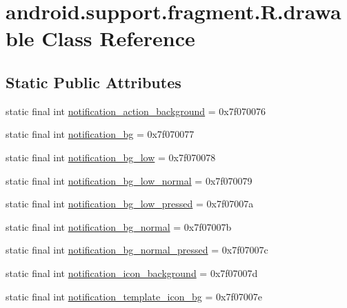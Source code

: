 \hypertarget{classandroid_1_1support_1_1fragment_1_1_r_1_1drawable}{}\section{android.\+support.\+fragment.\+R.\+drawable Class Reference}
\label{classandroid_1_1support_1_1fragment_1_1_r_1_1drawable}
\subsection*{Static Public Attributes}
\begin{DoxyCompactItemize}
\item 
static final int \mbox{\hyperlink{classandroid_1_1support_1_1fragment_1_1_r_1_1drawable_a086af7e7931dbe4e82c720a77fe3d3ae}{notification\+\_\+action\+\_\+background}} = 0x7f070076
\item 
static final int \mbox{\hyperlink{classandroid_1_1support_1_1fragment_1_1_r_1_1drawable_a6f047fed5aab004876674c2a21947011}{notification\+\_\+bg}} = 0x7f070077
\item 
static final int \mbox{\hyperlink{classandroid_1_1support_1_1fragment_1_1_r_1_1drawable_ae752bec4177894876af7fe198eef3a93}{notification\+\_\+bg\+\_\+low}} = 0x7f070078
\item 
static final int \mbox{\hyperlink{classandroid_1_1support_1_1fragment_1_1_r_1_1drawable_affebf5f3af26bcc00661a293dc1aab89}{notification\+\_\+bg\+\_\+low\+\_\+normal}} = 0x7f070079
\item 
static final int \mbox{\hyperlink{classandroid_1_1support_1_1fragment_1_1_r_1_1drawable_ae105cc655521bfd8d0a45fc06338ed5d}{notification\+\_\+bg\+\_\+low\+\_\+pressed}} = 0x7f07007a
\item 
static final int \mbox{\hyperlink{classandroid_1_1support_1_1fragment_1_1_r_1_1drawable_a58ea29ffeb1ee70047e694a612e479d0}{notification\+\_\+bg\+\_\+normal}} = 0x7f07007b
\item 
static final int \mbox{\hyperlink{classandroid_1_1support_1_1fragment_1_1_r_1_1drawable_a68c5f11206805023128791be315ec21e}{notification\+\_\+bg\+\_\+normal\+\_\+pressed}} = 0x7f07007c
\item 
static final int \mbox{\hyperlink{classandroid_1_1support_1_1fragment_1_1_r_1_1drawable_a865ae832f4735278aca10303e960e96c}{notification\+\_\+icon\+\_\+background}} = 0x7f07007d
\item 
static final int \mbox{\hyperlink{classandroid_1_1support_1_1fragment_1_1_r_1_1drawable_a1edff3cf073bb370d690cfb30db587fc}{notification\+\_\+template\+\_\+icon\+\_\+bg}} = 0x7f07007e

\end{DoxyCompactItemize}
